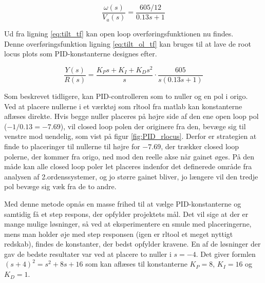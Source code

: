 \begin{equation}\label{eq:tilt_tf}
\frac{\omega(s)}{V_{a}(s)}=\frac{605/12}{0.13s+1}
\end{equation}

Ud fra ligning \ref{eq:tilt_tf} kan open loop overføringsfunktionen nu findes.\\ Denne overføringsfunktion ligning \eqref{eq:tilt_ol_tf} kan bruges til at lave de root locus plots som PID-konstanterne designes efter.

\begin{equation}\label{eq:tilt_ol_tf}
\frac{Y(s)}{R(s)}=\frac{K_{P}s+K_{I}+K_{D}s^2}{s}\cdot\frac{605}{s(0.13s+1)}
\end{equation}

Som beskrevet tidligere, kan PID-controlleren som to nuller og en pol i origo.\\ Ved at placere nullerne i et værktøj som rltool fra matlab kan konstanterne aflæses direkte. Hvis begge nuller placeres på højre side af den ene open loop pol ($-1/0.13=-7.69$), vil closed loop polen der originere fra den, bevæge sig til venstre mod uendelig, som vist på figur \ref{fig:PID_rlocus}. Derfor er strategien at finde to placeringer til nullerne til højre for $-7.69$, der trækker closed loop polerne, der kommer fra origo, ned mod den reelle akse når gainet øges. På den måde kan alle closed loop poler let placeres indenfor det definerede område fra analysen af 2.ordenssystemer, og jo større gainet bliver, jo længere vil den tredje pol bevæge sig væk fra de to andre.

Med denne metode opnås en masse frihed til at vælge PID-konstanterne og samtidig få et step respons, der opfylder projektets mål. Det vil sige at der er mange mulige løsninger, så ved at eksperimentere en smule med placeringerne, mens man holder øje med step responsen (igen er rltool et meget nyttigt redskab), findes de konstanter, der bedst opfylder kravene. En af de løsninger der gav de bedste resultater var ved at placere to nuller i $s=-4$. Det giver formlen $(s+4)^2=s^2+8s+16$ som kan aflæses til konstanterne $K_{P}=8$, $K_{I}=16$ og $K_{D}=1$. 

